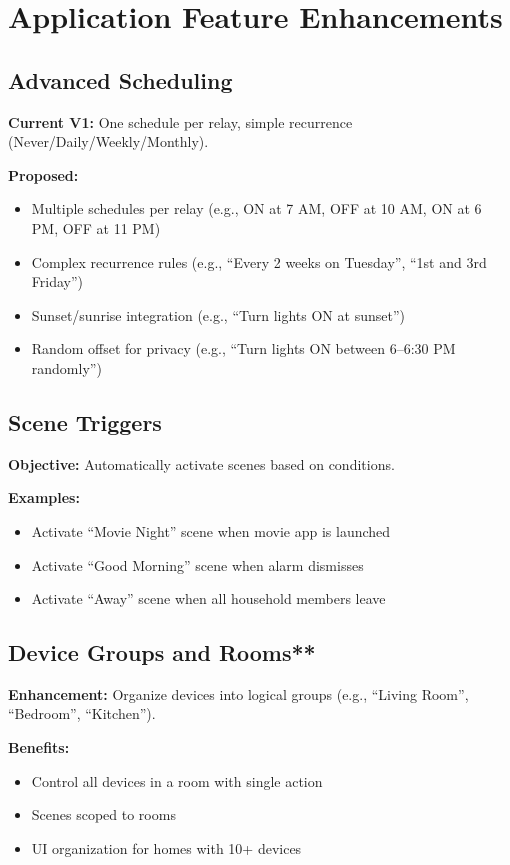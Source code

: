 \section{Application Feature Enhancements}

\subsection{Advanced Scheduling}

\textbf{Current V1:} One schedule per relay, simple recurrence (Never/Daily/Weekly/Monthly).

\textbf{Proposed:}
\begin{itemize}
    \item Multiple schedules per relay (e.g., ON at 7 AM, OFF at 10 AM, ON at 6 PM, OFF at 11 PM)
    \item Complex recurrence rules (e.g., ``Every 2 weeks on Tuesday'', ``1st and 3rd Friday'')
    \item Sunset/sunrise integration (e.g., ``Turn lights ON at sunset'')
    \item Random offset for privacy (e.g., ``Turn lights ON between 6–6:30 PM randomly'')
\end{itemize}

\subsection{Scene Triggers}

\textbf{Objective:} Automatically activate scenes based on conditions.

\textbf{Examples:}
\begin{itemize}
    \item Activate ``Movie Night'' scene when movie app is launched
    \item Activate ``Good Morning'' scene when alarm dismisses
    \item Activate ``Away'' scene when all household members leave
\end{itemize}

\subsection{Device Groups and Rooms**}

\textbf{Enhancement:} Organize devices into logical groups (e.g., ``Living Room'', ``Bedroom'', ``Kitchen'').

\textbf{Benefits:}
\begin{itemize}
    \item Control all devices in a room with single action
    \item Scenes scoped to rooms
    \item UI organization for homes with 10+ devices
\end{itemize}

